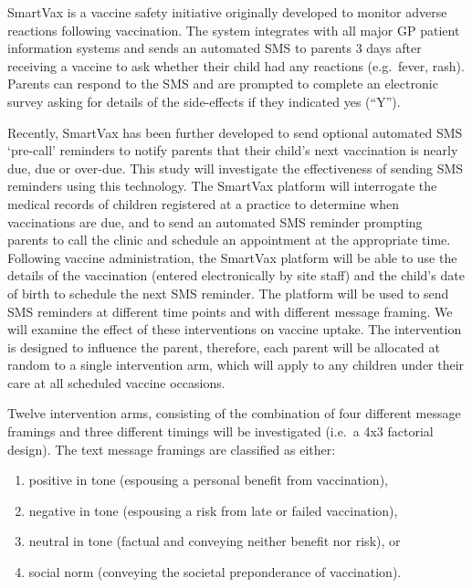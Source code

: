 \documentclass[
  bibliography=totoc]{scrreprt}
\providecommand{\tightlist}{%
  \setlength{\itemsep}{0pt}\setlength{\parskip}{0pt}}
\begin{document}
SmartVax is a vaccine safety initiative originally developed to monitor adverse reactions following vaccination.
The system integrates with all major GP patient information systems and sends an automated SMS to parents 3 days after receiving a vaccine to ask whether their child had any reactions (e.g.~fever, rash).
Parents can respond to the SMS and are prompted to complete an electronic survey asking for details of the side-effects if they indicated yes (``Y'').

Recently, SmartVax has been further developed to send optional automated SMS `pre-call' reminders to notify parents that their child's next vaccination is nearly due, due or over-due.
This study will investigate the effectiveness of sending SMS reminders using this technology.
The SmartVax platform will interrogate the medical records of children registered at a practice to determine when vaccinations are due, and to send an automated SMS reminder prompting parents to call the clinic and schedule an appointment at the appropriate time.
Following vaccine administration, the SmartVax platform will be able to use the details of the vaccination (entered electronically by site staff) and the child's date of birth to schedule the next SMS reminder.
The platform will be used to send SMS reminders at different time points and with different message framing.
We will examine the effect of these interventions on vaccine uptake.
The intervention is designed to influence the parent, therefore, each parent will be allocated at random to a single intervention arm, which will apply to any children under their care at all scheduled vaccine occasions.

Twelve intervention arms, consisting of the combination of four different message framings and three different timings will be investigated (i.e.~a 4x3 factorial design).
The text message framings are classified as either:

\begin{enumerate}
\def\labelenumi{\arabic{enumi}.}
\tightlist
\item
  positive in tone (espousing a personal benefit from vaccination),
\item
  negative in tone (espousing a risk from late or failed vaccination),
\item
  neutral in tone (factual and conveying neither benefit nor risk), or
\item
  social norm (conveying the societal preponderance of vaccination).
\end{enumerate}
\end{document}
